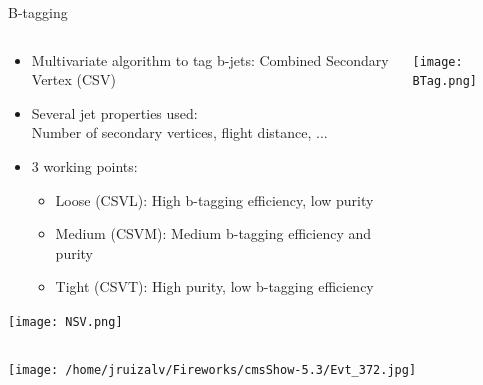\begin{frame}{B-tagging}
\vspace{-.2cm}

\begin{columns}
\begin{column}{.40\textwidth}
\begin{block}{}\tiny
  \begin{itemize}
  \item Multivariate algorithm to tag b-jets: Combined Secondary Vertex (CSV)
  \item Several jet properties used: \\Number of secondary vertices, flight distance, ...
  \item 3 working points:
    \begin{itemize}\tiny
    \item Loose (CSVL): High b-tagging efficiency, low purity
    \item Medium (CSVM): Medium b-tagging efficiency and purity
    \item Tight (CSVT): High purity, low b-tagging efficiency
    \end{itemize}
  \end{itemize}
\end{block}
\texttt{[image: NSV.png]}
\end{column}
\begin{column}{.60\textwidth}
\texttt{[image: BTag.png]}
\end{column}
\end{columns}

\end{frame}

\begin{frame}{}

\texttt{[image: /home/jruizalv/Fireworks/cmsShow-5.3/Evt\_372.jpg]}

\end{frame}

